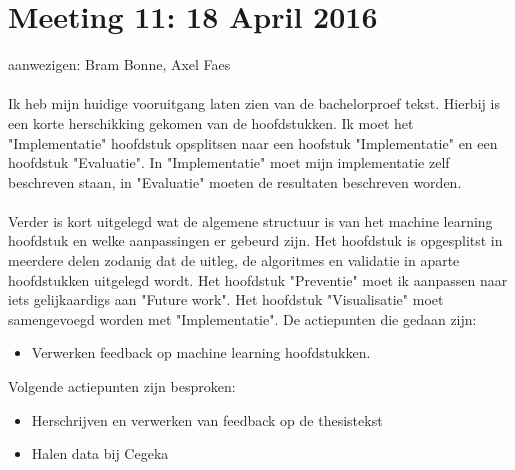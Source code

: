 \section{Meeting 11: 18 April 2016}
aanwezigen: Bram Bonne, Axel Faes \\
\\
Ik heb mijn huidige vooruitgang laten zien van de bachelorproef tekst. Hierbij is een korte herschikking gekomen van de hoofdstukken. Ik moet het "Implementatie" hoofdstuk opsplitsen naar een hoofstuk "Implementatie" en een hoofdstuk "Evaluatie". In "Implementatie" moet mijn implementatie zelf beschreven staan, in "Evaluatie" moeten de resultaten beschreven worden. \\\\
Verder is kort uitgelegd wat de algemene structuur is van het machine learning hoofdstuk en welke aanpassingen er gebeurd zijn. Het hoofdstuk is opgesplitst in meerdere delen zodanig dat de uitleg, de algoritmes en validatie in aparte hoofdstukken uitgelegd wordt. Het hoofdstuk "Preventie" moet ik aanpassen naar iets gelijkaardigs aan "Future work". Het hoofdstuk "Visualisatie" moet samengevoegd worden met "Implementatie".
De actiepunten die gedaan zijn:
\begin{itemize}  
        \item  Verwerken feedback op machine learning hoofdstukken.
\end{itemize}

Volgende actiepunten zijn besproken:
\begin{itemize}  		
		\item Herschrijven en verwerken van feedback op de thesistekst
        \item Halen data bij Cegeka
\end{itemize}

